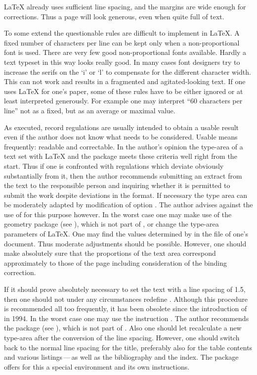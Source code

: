 {\LaTeX} already uses sufficient line spacing, and the margins are
wide enough for corrections. Thus a page will look generous, even when
quite full of text.

To some extend the questionable rules are difficult to implement in
{\LaTeX}. A fixed number of characters per line can be kept only when
a non-proportional font is used. There are very few good
non-proportional fonts available. Hardly a text typeset in this way
looks really good. In many cases font designers try to increase the
serifs on the `i' or `l' to compensate for the different character
width. This can not work and results in a fragmented and
agitated-looking text. If one uses {\LaTeX} for one's paper, some of
these rules have to be either ignored or at least interpreted
generously. For example one may interpret ``60 characters per line''
not as a fixed, but as an average or maximal value.%

As executed, record regulations are usually intended to obtain a
usable result even if the author does not know what needs to be
considered. Usable means frequently: readable and correctable.  In
the author's opinion the type-area of a text set with {\LaTeX} and the
 package meets these criteria well right from the
start.  Thus if one is confronted with regulations which deviate
obviously substantially from it, then the author recommends submitting
an extract from the text to the responsible person and inquiring
whether it is permitted to submit the work despite deviations in the
format.  If necessary the type area can be moderately adapted by
modification of option .  The author advises against the
use of  for this purpose however.  In the worst case
one may make use of the geometry package (see
\cite{package:geometry}), which is not part of \KOMAScript, or change
the type-area parameters of \LaTeX.  One may find the values
determined by  in the  file of one's
document.  Thus moderate adjustments should be possible.  However, one
should make absolutely sure that the proportions of the text area
correspond approximately to those of the page including consideration
of the binding correction.

If it should prove absolutely necessary to set the text with a line
spacing of 1.5, then one should not under any circumstances redefine
.  Although this procedure is recommended all
too frequently, it has been obsolete since the introduction of
{\LaTeXe} in 1994.  In the worst case one may use the instruction
.  The author recommends the package
 (see
\cite{package:setspace}), which is not part of \KOMAScript.  Also one
should let  recalculate a new type-area after the
conversion of the line spacing.  However, one should switch back to
the normal line spacing for the title, preferably also for the table
contents and various listings\,---\,as well as the bibliography and
the index.  The  package offers for this a special
environment and its own instructions.

